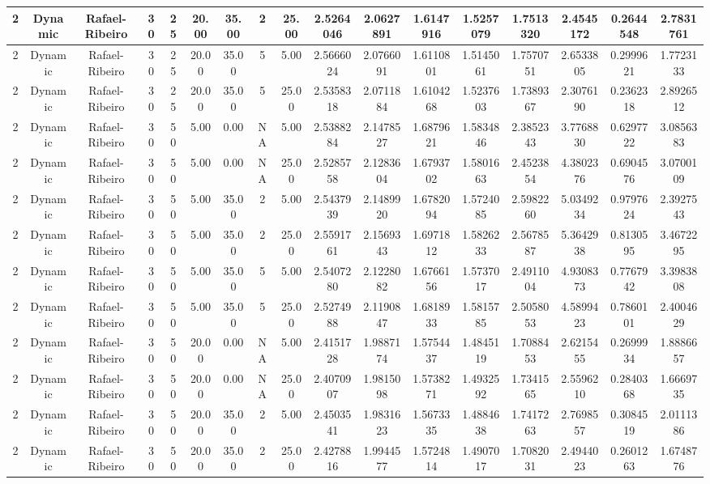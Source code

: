\begin{longtable}{ | c | c | c | c | c | c | c | c | c | c | c | c | c | c | c | c | c | }
	\hline
	2	&	Dynamic	&	Rafael-Ribeiro	&	30	&	25	&	20.00	&	35.00	&	2	&	25.00	&	2.5264046	&	2.0627891	&	1.6147916	&	1.5257079	&	1.7513320	&	2.4545172	&	0.2644548	&	2.7831761 \\
	\hline
	2	&	Dynamic	&	Rafael-Ribeiro	&	30	&	25	&	20.00	&	35.00	&	5	&	5.00	&	2.5666024	&	2.0766091	&	1.6110801	&	1.5145061	&	1.7570751	&	2.6533805	&	0.2999621	&	1.7723133 \\
	\hline
	2	&	Dynamic	&	Rafael-Ribeiro	&	30	&	25	&	20.00	&	35.00	&	5	&	25.00	&	2.5358318	&	2.0711884	&	1.6104268	&	1.5237603	&	1.7389367	&	2.3076190	&	0.2362318	&	2.8926512 \\
	\hline
	2	&	Dynamic	&	Rafael-Ribeiro	&	30	&	50	&	5.00	&	0.00	&	NA	&	5.00	&	2.5388284	&	2.1478527	&	1.6879621	&	1.5834846	&	2.3852343	&	3.7768830	&	0.6297722	&	3.0856383 \\
	\hline
	2	&	Dynamic	&	Rafael-Ribeiro	&	30	&	50	&	5.00	&	0.00	&	NA	&	25.00	&	2.5285758	&	2.1283604	&	1.6793702	&	1.5801663	&	2.4523854	&	4.3802376	&	0.6904576	&	3.0700109 \\
	\hline
	2	&	Dynamic	&	Rafael-Ribeiro	&	30	&	50	&	5.00	&	35.00	&	2	&	5.00	&	2.5437939	&	2.1489920	&	1.6782094	&	1.5724085	&	2.5982260	&	5.0349234	&	0.9797624	&	2.3927543 \\
	\hline
	2	&	Dynamic	&	Rafael-Ribeiro	&	30	&	50	&	5.00	&	35.00	&	2	&	25.00	&	2.5591761	&	2.1569343	&	1.6971812	&	1.5826233	&	2.5678587	&	5.3642938	&	0.8130595	&	3.4672295 \\
	\hline
	2	&	Dynamic	&	Rafael-Ribeiro	&	30	&	50	&	5.00	&	35.00	&	5	&	5.00	&	2.5407280	&	2.1228082	&	1.6766156	&	1.5737017	&	2.4911004	&	4.9308373	&	0.7767942	&	3.3983808 \\
	\hline
	2	&	Dynamic	&	Rafael-Ribeiro	&	30	&	50	&	5.00	&	35.00	&	5	&	25.00	&	2.5274988	&	2.1190847	&	1.6818933	&	1.5815785	&	2.5058053	&	4.5899423	&	0.7860101	&	2.4004629 \\
	\hline
	2	&	Dynamic	&	Rafael-Ribeiro	&	30	&	50	&	20.00	&	0.00	&	NA	&	5.00	&	2.4151728	&	1.9887174	&	1.5754437	&	1.4845119	&	1.7088453	&	2.6215455	&	0.2699934	&	1.8886657 \\
	\hline
	2	&	Dynamic	&	Rafael-Ribeiro	&	30	&	50	&	20.00	&	0.00	&	NA	&	25.00	&	2.4070907	&	1.9815098	&	1.5738271	&	1.4932592	&	1.7341565	&	2.5596210	&	0.2840368	&	1.6669735 \\
	\hline
	2	&	Dynamic	&	Rafael-Ribeiro	&	30	&	50	&	20.00	&	35.00	&	2	&	5.00	&	2.4503541	&	1.9831623	&	1.5673335	&	1.4884638	&	1.7417263	&	2.7698557	&	0.3084519	&	2.0111386 \\
	\hline
	2	&	Dynamic	&	Rafael-Ribeiro	&	30	&	50	&	20.00	&	35.00	&	2	&	25.00	&	2.4278816	&	1.9944577	&	1.5724814	&	1.4907017	&	1.7082031	&	2.4944023	&	0.2601263	&	1.6748776 \\

\end{longtable}
